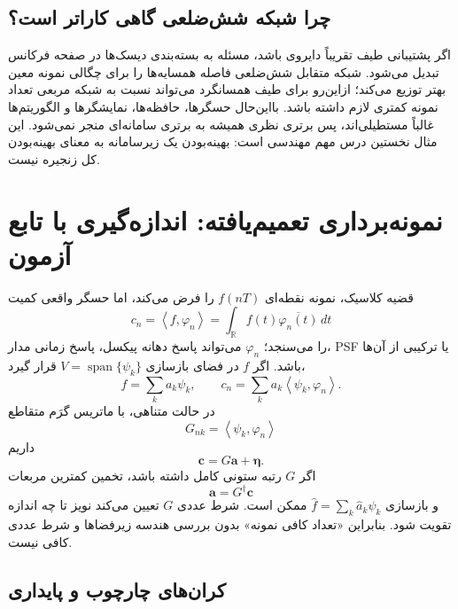 \documentclass[12pt,openany,oneside]{book}
\newcommand{\R}{\mathbb{R}}
\newcommand{\inner}[2]{\left\langle #1,#2\right\rangle}
\newcommand{\vect}[1]{\bm{#1}}
\begin{document}
\subsection{چرا شبکه شش‌ضلعی گاهی کاراتر است؟}

اگر پشتیبانی طیف تقریباً دایروی باشد، مسئله به بسته‌بندی دیسک‌ها در صفحه فرکانس تبدیل می‌شود.
شبکه متقابل شش‌ضلعی فاصله همسایه‌ها را برای چگالی نمونه معین بهتر توزیع می‌کند؛ ازاین‌رو برای
طیف همسانگرد می‌تواند نسبت به شبکه مربعی تعداد نمونه کمتری لازم داشته باشد. بااین‌حال حسگرها،
حافظه‌ها، نمایشگرها و الگوریتم‌ها غالباً مستطیلی‌اند، پس برتری نظری همیشه به برتری سامانه‌ای
منجر نمی‌شود. این مثال نخستین درس مهم مهندسی است: بهینه‌بودن یک زیرسامانه به معنای بهینه‌بودن
کل زنجیره نیست.


\section{نمونه‌برداری تعمیم‌یافته: اندازه‌گیری با تابع آزمون}

قضیه کلاسیک، نمونه نقطه‌ای \(f(nT)\) را فرض می‌کند، اما حسگر واقعی کمیت
\begin{equation}
c_n=\inner{f}{\varphi_n}
=\int_{\R}f(t)\overline{\varphi_n(t)}\,dt
\label{eq:generalized-sample}
\end{equation}
را می‌سنجد؛ \(\varphi_n\) می‌تواند پاسخ دهانه پیکسل، پاسخ زمانی مدار، PSF یا ترکیبی از آن‌ها باشد.
اگر \(f\) در فضای بازسازی \(V=\operatorname{span}\{\psi_k\}\) قرار گیرد،
\begin{equation}
f=\sum_k a_k\psi_k,
\qquad
c_n=\sum_k a_k\inner{\psi_k}{\varphi_n}.
\end{equation}
در حالت متناهی، با ماتریس گرَم متقاطع
\begin{equation}
G_{nk}=\inner{\psi_k}{\varphi_n}
\end{equation}
داریم
\begin{equation}
\vect c=G\vect a+\vect\eta.
\label{eq:generalized-linear}
\end{equation}
اگر \(G\) رتبه ستونی کامل داشته باشد، تخمین کمترین مربعات
\begin{equation}
\widehat{\vect a}=G^\dagger\vect c
\end{equation}
و بازسازی \(\widehat f=\sum_k\widehat a_k\psi_k\) ممکن است. شرط عددی \(G\) تعیین می‌کند نویز تا چه
اندازه تقویت شود. بنابراین «تعداد کافی نمونه» بدون بررسی هندسه زیر‌فضاها و شرط عددی کافی نیست.

\subsection{کران‌های چارچوب و پایداری}
\end{document}
